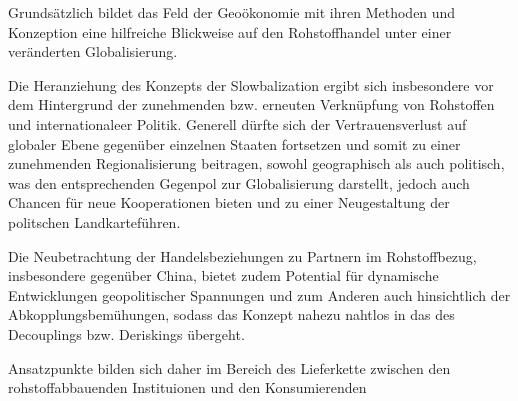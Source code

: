 \documentclass[12pt,a4paper,oneside]{book} %
\begin{document}
	Grundsätzlich bildet das Feld der Geoökonomie mit ihren Methoden und Konzeption eine hilfreiche Blickweise auf den Rohstoffhandel unter einer veränderten Globalisierung.
	
	Die Heranziehung des Konzepts der Slowbalization ergibt sich insbesondere vor dem Hintergrund der zunehmenden bzw. erneuten Verknüpfung von Rohstoffen und internationaleer Politik. Generell dürfte sich der Vertrauensverlust auf globaler Ebene gegenüber einzelnen Staaten fortsetzen und somit zu einer zunehmenden Regionalisierung beitragen, sowohl geographisch als auch politisch, was den entsprechenden Gegenpol zur Globalisierung darstellt, jedoch auch Chancen für neue Kooperationen bieten und zu einer \glqq Neugestaltung der politschen Landkarte\grqq führen.\autocite{UI Report, The politics of critical raw materials, S. 4-5}
	
	Die Neubetrachtung der Handelsbeziehungen zu Partnern im Rohstoffbezug, insbesondere gegenüber China, bietet zudem Potential für dynamische Entwicklungen geopolitischer Spannungen und zum Anderen auch hinsichtlich der Abkopplungsbemühungen, sodass das Konzept nahezu nahtlos in das des Decouplings bzw. Deriskings übergeht. 
	
	Ansatzpunkte bilden sich daher im Bereich des Lieferkette zwischen den rohstoffabbauenden Instituionen und den Konsumierenden
	
	
\end{document}
